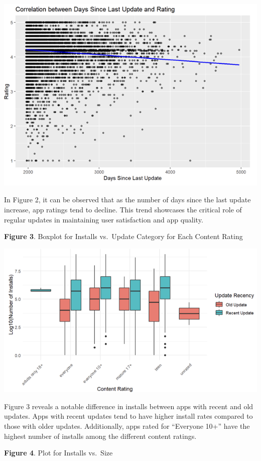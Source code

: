 \documentclass[
]{article}
\begin{document}
\includegraphics{rating_vs_days_since_update.png}

In Figure 2, it can be observed that as the number of days since the
last update increase, app ratings tend to decline. This trend showcases
the critical role of regular updates in maintaining user satisfaction
and app quality.

\textbf{Figure 3}. Boxplot for Installs vs.~Update Category for Each
Content Rating

\includegraphics{installs_vs_update_vs_content_rating.png}

Figure 3 reveals a notable difference in installs between apps with
recent and old updates. Apps with recent updates tend to have higher
install rates compared to those with older updates. Additionally, apps
rated for ``Everyone 10+'' have the highest number of installs among the
different content ratings.

\textbf{Figure 4}. Plot for Installs vs.~Size
\end{document}
